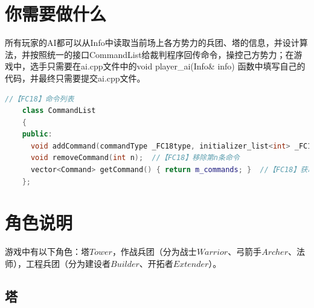 \documentclass[a4paper,4pt]{article}
\begin{document}
\section{你需要做什么}
所有玩家的AI都可以从Info中读取当前场上各方势力的兵团、塔的信息，并设计算法，并按照统一的接口CommandList给裁判程序回传命令，操控己方势力；在游戏中，选手只需要在ai.cpp文件中的void player\_ai(Info\& info) {  }函数中填写自己的代码，并最终只需要提交ai.cpp文件。
\begin{lstlisting}[language={C++},title={添加命令有关代码}]  %插入代码块
    //【FC18】命令列表
    class CommandList
    {
    public:
      void addCommand(commandType _FC18type, initializer_list<int> _FC18parameters);
      void removeCommand(int n);  //【FC18】移除第n条命令
      vector<Command> getCommand() { return m_commands; }  //【FC18】获取所有命令
    };
\end{lstlisting}

\section{角色说明}
游戏中有以下角色：塔$Tower$，作战兵团（分为战士$Warrior$、弓箭手$Archer$、法师），工程兵团（分为建设者$Builder$、开拓者$Extender$）。
\subsection{塔}
\end{document}

